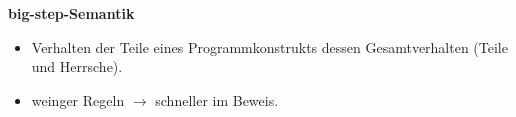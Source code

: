 \documentclass[a4paper,12pt,twoside,headsepline]{scrartcl}
\begin{document}
  
  
  \textbf{big-step-Semantik}
\begin{itemize}
	\item Verhalten der Teile eines Programmkonstrukts dessen Gesamtverhalten (Teile und Herrsche).
	\item weinger Regeln $\rightarrow$ schneller im Beweis.
\end{itemize}
  
  


\nocite{*} 


\end{document}
